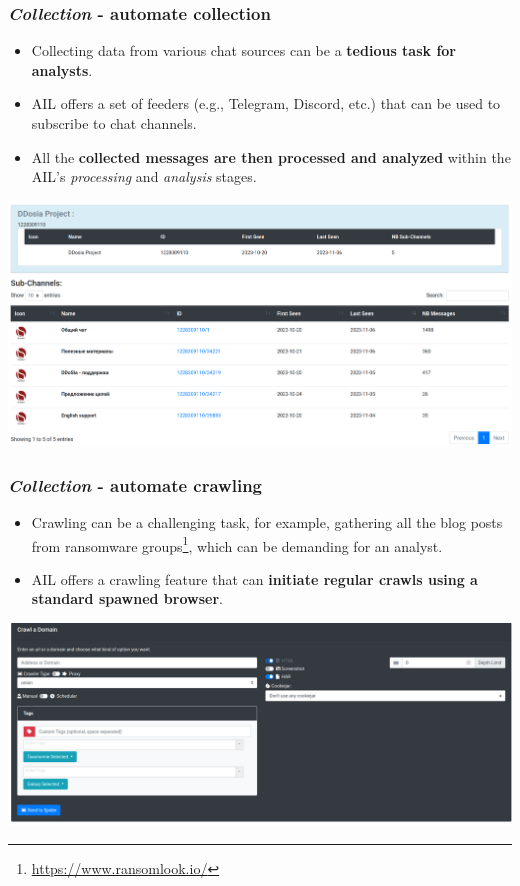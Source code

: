 \documentclass{beamer}
\begin{document}
\begin{frame}
    \frametitle{{\it Collection} - automate collection}
	\begin{itemize}
		\item Collecting data from various chat sources can be a {\bf tedious task for analysts}.
		\item AIL offers a set of feeders (e.g., Telegram, Discord, etc.) that can be used to subscribe to chat channels.
        \item All the {\bf collected messages are then processed and analyzed} within the AIL's \textit{processing} and \textit{analysis} stages.
	\end{itemize}
\begin{center}
    \includegraphics[scale=0.20]{images/ail-telegram-third.png}
\end{center}
\end{frame}

\begin{frame}
    \frametitle{{\it Collection} - automate crawling}
    
\begin{itemize}
    \item Crawling can be a challenging task, for example, gathering all the blog posts from ransomware groups\footnote{\url{https://www.ransomlook.io/}}, which can be demanding for an analyst.
    \item AIL offers a crawling feature that can {\bf initiate regular crawls using a standard spawned browser}.
\end{itemize}
    \begin{center}
        \includegraphics[scale=0.17]{images/ail-crawling.png}
    \end{center}
\end{frame}
\end{document}
